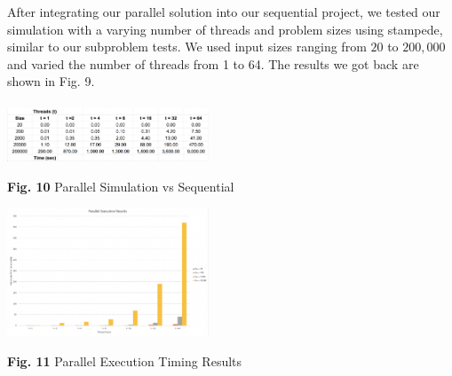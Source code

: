 \documentclass[conference]{IEEEtran}
\begin{document}
\hspace*{.2cm} After integrating our parallel solution into our sequential project, we tested our simulation with a varying number of threads and problem sizes using stampede, similar to our subproblem tests. We used input sizes ranging from $20$ to $200,000$ and varied the number of threads from 1 to 64. The results we got back are shown in Fig. 9. \\ \\

\includegraphics[width=0.45\textwidth]{images/results} \\
\begin{center}
	\textbf{Fig. 10} Parallel Simulation vs Sequential \\
\end{center}


\includegraphics[width=0.45\textwidth]{images/timeVSthreads}
\begin{center}
	\textbf{Fig. 11} Parallel Execution Timing Results \\
\end{center}
\end{document}
